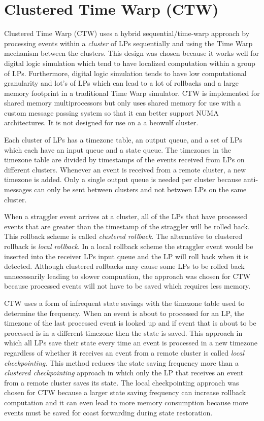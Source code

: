 \documentclass[11pt]{book}
\begin{document}
\section{Clustered Time Warp (CTW)}

Clustered Time Warp\cite{avril-95} (CTW) uses a hybrid sequential/time-warp approach by processing
events within a \emph{cluster} of LPs sequentially and using the Time Warp mechanism between
the clusters.  This design was chosen because it works well for digital logic simulation which tend
to have localized computation within a group of LPs.  Furthermore, digital logic simulation tends
to have low computational granularity and lot's of LPs which can lead to a lot of rollbacks
and a large memory footprint in a traditional Time Warp simulator.  CTW is implemented for
shared memory multiprocessors but only uses shared memory for use with a custom message passing
system so that it can better support NUMA architectures.  It is not designed for use on a
a beowulf cluster.

Each cluster of LPs has a timezone table, an output queue, and a set of LPs which each have an
input queue and a state queue.  The timezones in the timezone table are divided by timestamps
of the events received from LPs on different clusters.  Whenever an event is received from
a remote cluster, a new timezone is added.  Only a single output queue is needed per cluster
because anti-messages can only be sent between clusters and not between LPs on the same
cluster.

When a straggler event arrives at a cluster, all of the LPs that have processed events that
are greater than the timestamp of the straggler will be rolled back.  This rollback scheme is
called \emph{clustered rollback}.  The alternative to clustered rollback is \emph{local
rollback}.  In a local rollback scheme the straggler event would be inserted into the receiver
LPs input queue and the LP will roll back when it is detected.  Although clustered rollbacks
may cause some LPs to be rolled back unnecessarily leading to slower compuation, the
approach was chosen for CTW because processed events will not have to be saved which
requires less memory.

CTW uses a form of infrequent state savings with the timezone table used to determine the
frequency.  When an event is about to processed for an LP, the timezone of the last processed
event is looked up and if event that is about to be processed is in a different timezone then
the state is saved.  This approach in which all LPs save their state every time an event is
processed in a new timezone regardless of whether it receives an event from a remote cluster
is called \emph{local checkpointing}.  This method reduces the state saving frequency more
than a \emph{clustered checkpointing} approach in which only the LP that receives an event
from a remote cluster saves its state.  The local checkpointing approach was chosen for CTW
because a larger state saving frequency can increase rollback computation and it can even
lead to more memory consumption because more events must be saved for coast forwarding
during state restoration.
\end{document}
